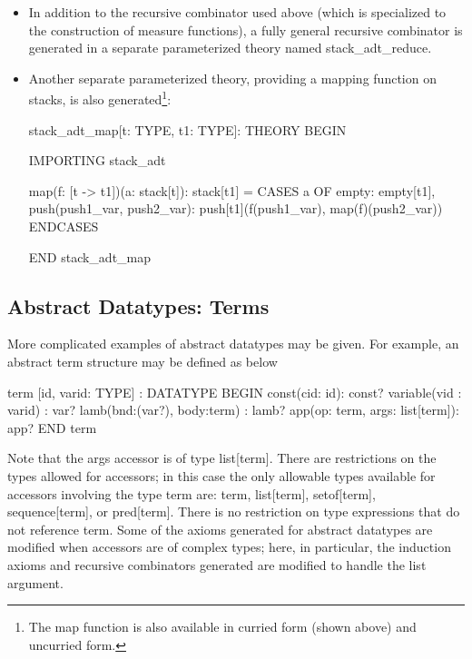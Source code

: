 \begin{itemize}
\item In addition to the recursive combinator used above (which is
specialized to the construction of measure functions), a fully general
recursive combinator is generated in a separate parameterized theory
named {\stt stack\_adt\_reduce}.

\item Another separate parameterized theory, providing a mapping function
on stacks, is also generated\footnote{The map function is also available
in curried form (shown above) and uncurried form.}:
\begin{pvsex}
  stack_adt_map[t: TYPE, t1: TYPE]: THEORY
    BEGIN
  
    IMPORTING stack_adt
  
    map(f: [t -> t1])(a: stack[t]): stack[t1] =
      CASES a OF
        empty: empty[t1],
        push(push1_var, push2_var):
            push[t1](f(push1_var), map(f)(push2_var))
      ENDCASES
 
    END stack_adt_map
\end{pvsex}

\end{itemize}

\subsection{Abstract Datatypes: Terms}

More complicated examples of abstract datatypes may be given.  For
example, an abstract term structure may be defined as below
\begin{pvsex}
  term [id, varid: TYPE] : DATATYPE
   BEGIN
    const(cid: id): const?
    variable(vid : varid) : var?
    lamb(bnd:(var?), body:term) : lamb?
    app(op: term, args: list[term]): app?
   END term
\end{pvsex}
%
Note that the {\stt args} accessor is of type {\stt list[term]}.
There are restrictions on the types allowed for accessors; in this
case the only allowable types available for accessors involving the
type {\stt term} are: {\stt term}, {\stt list[term]}, {\stt
setof[term]}, {\stt sequence[term]}, or {\stt pred[term]}.  There is
no restriction on type expressions that do not reference {\stt term}.
Some of the axioms generated for abstract datatypes are modified when
accessors are of complex types; here, in particular, the induction axioms
and recursive combinators generated are modified to handle the list argument.

%
%     


